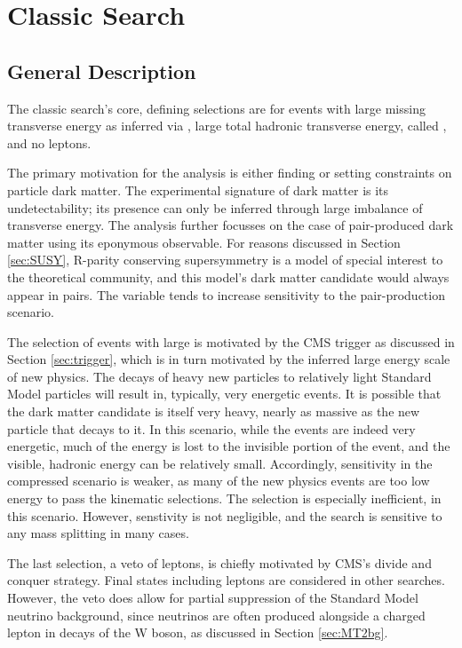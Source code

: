 \section{Classic Search} \label{sec:MT2classic}

  \subsection{General Description} \label{sec:classicdescription}

  The classic search's core, defining selections are for events with large missing transverse energy \met as inferred via \mttwo, large total hadronic transverse energy, called \Ht, and no leptons.

  The primary motivation for the analysis is either finding or setting constraints on particle dark matter.
  The experimental signature of dark matter is its undetectability; its presence can only be inferred through large imbalance of transverse energy.
  The \mttwo analysis further focusses on the case of pair-produced dark matter using its eponymous observable.
  For reasons discussed in Section \ref{sec:SUSY}, R-parity conserving supersymmetry is a model of special interest to the theoretical community, and this model's dark matter candidate would always appear in pairs.
  The \mttwo variable tends to increase sensitivity to the pair-production scenario.

  The selection of events with large \Ht is motivated by the CMS trigger as discussed in Section \ref{sec:trigger}, which is in turn motivated by the inferred large energy scale of new physics.
  The decays of heavy new particles to relatively light Standard Model particles will result in, typically, very energetic events.
  It is possible that the dark matter candidate is itself very heavy, nearly as massive as the new particle that decays to it.
  In this scenario, while the events are indeed very energetic, much of the energy is lost to the invisible portion of the event, and the visible, hadronic energy can be relatively small.
  Accordingly, sensitivity in the compressed scenario is weaker, as many of the new physics events are too low energy to pass the kinematic selections.
  The \mttwo selection is especially inefficient, in this scenario.
  However, senstivity is not negligible, and the search is sensitive to any mass splitting in many cases.
  
  The last selection, a veto of leptons, is chiefly motivated by CMS's divide and conquer strategy.
  Final states including leptons are considered in other searches.
  However, the veto does allow for partial suppression of the Standard Model neutrino background, since neutrinos are often produced alongside a charged lepton in decays of the W boson, as discussed in Section \ref{sec:MT2bg}.

